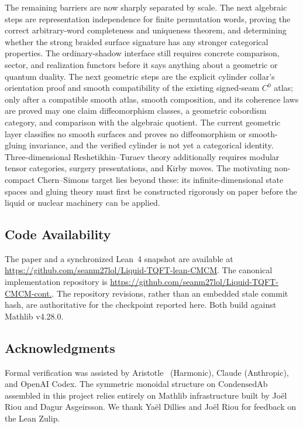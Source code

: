 \documentclass[11pt]{amsart}
\theoremstyle{plain}
\theoremstyle{definition}
\newcommand{\CondAb}{\mathrm{CondensedAb}}
\begin{document}
The remaining barriers are now sharply separated by scale. The next algebraic steps are representation independence for finite permutation words, proving the correct arbitrary-word completeness and uniqueness theorem, and determining whether the strong braided surface signature has any stronger categorical properties. The ordinary-shadow interface still requires concrete comparison, sector, and realization functors before it says anything about a geometric or quantum duality. The next geometric steps are the explicit cylinder collar's orientation proof and smooth compatibility of the existing signed-seam $C^0$ atlas; only after a compatible smooth atlas, smooth composition, and its coherence laws are proved may one claim diffeomorphism classes, a geometric cobordism category, and comparison with the algebraic quotient. The current geometric layer classifies no smooth surfaces and proves no diffeomorphism or smooth-gluing invariance, and the verified cylinder is not yet a categorical identity. Three-dimensional Reshetikhin--Turaev theory additionally requires modular tensor categories, surgery presentations, and Kirby moves. The motivating non-compact Chern--Simons target lies beyond these: its infinite-dimensional state spaces and gluing theory must first be constructed rigorously on paper before the liquid or nuclear machinery can be applied.

\subsection*{Code Availability}

The paper and a synchronized Lean~4 snapshot are available at \url{https://github.com/seanm27lol/Liquid-TQFT-lean-CMCM}. The canonical implementation repository is \url{https://github.com/seanm27lol/Liquid-TQFT-CMCM-cont.}. The repository revisions, rather than an embedded stale commit hash, are authoritative for the checkpoint reported here. Both build against Mathlib v4.28.0.

\subsection*{Acknowledgments}

Formal verification was assisted by Aristotle~\cite{Aristotle2025} (Harmonic), Claude (Anthropic), and OpenAI Codex. The symmetric monoidal structure on $\CondAb$ assembled in this project relies entirely on Mathlib infrastructure built by Jo\"el Riou and Dagur Asgeirsson. We thank Ya\"el Dillies and Jo\"el Riou for feedback on the Lean Zulip.



\end{document}

